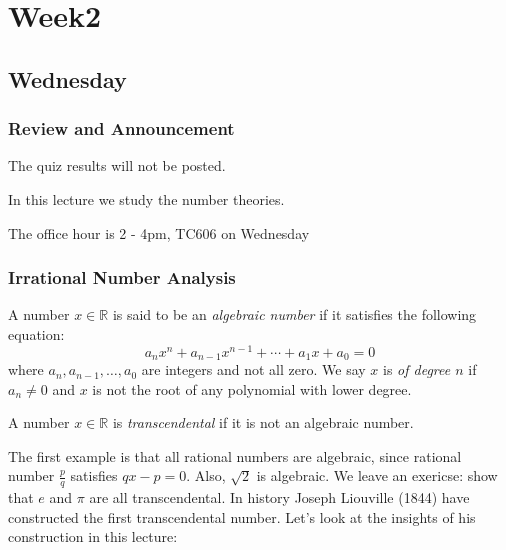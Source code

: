 
\chapter{Week2}
\section{Wednesday}
\subsection{Review and Announcement}
The quiz results will not be posted.

In this lecture we study the number theories.

The office hour is 2 - 4pm, TC606 on Wednesday
\subsection{Irrational Number Analysis}
\begin{definition}
A number $x\in\mathbb{R}$ is said to be an \emph{algebraic number} if it satisfies the following equation:
\begin{equation}
a_nx^n+a_{n-1}x^{n-1}+\cdots+a_1x+a_0=0
\end{equation}
where $a_n,a_{n-1},\dots,a_0$ are integers and not all zero. We say $x$ is \emph{of degree $n$} if $a_n\ne0$ and $x$ is not the root of any polynomial with lower degree.
\end{definition}
\begin{definition}
A number $x\in\mathbb{R}$ is \emph{transcendental} if it is not an algebraic number.
\end{definition}

The first example is that all rational numbers are algebraic, since rational number $\frac{p}{q}$ satisfies $qx-p=0$. Also, $\sqrt{2}$ is algebraic. We leave an exericse: show that $e$ and $\pi$ are all transcendental. In history Joseph Liouville (1844) have constructed the first transcendental number. Let's look at the insights of his construction in this lecture:

